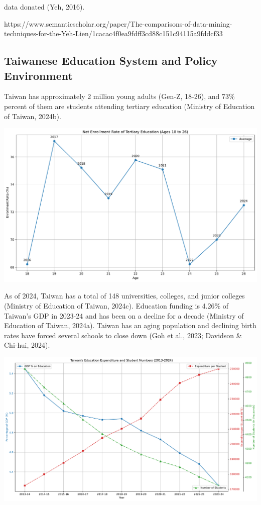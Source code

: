 \documentclass[
  letterpaper,
  DIV=11,
  numbers=noendperiod]{scrartcl}
\begin{document}
data donated (Yeh, 2016).

https://www.semanticscholar.org/paper/The-comparisons-of-data-mining-techniques-for-the-Yeh-Lien/1cacac4f0ea9fdff3cd88c151c94115a9fddcf33

\subsection{Taiwanese Education System and Policy
Environment}\label{taiwanese-education-system-and-policy-environment}

Taiwan has approximately 2 million young adults (Gen-Z, 18-26), and 73\%
percent of them are students attending tertiary education (Ministry of
Education of Taiwan, 2024b).

\includegraphics{_thesis_files/figure-pdf/cell-4-output-1.pdf}

As of 2024, Taiwan has a total of 148 universities, colleges, and junior
colleges (Ministry of Education of Taiwan, 2024c). Education funding is
4.26\% of Taiwan's GDP in 2023-24 and has been on a decline for a decade
(Ministry of Education of Taiwan, 2024a). Taiwan has an aging population
and declining birth rates have forced several schools to close down (Goh
et al., 2023; Davidson \& Chi-hui, 2024).

\includegraphics{_thesis_files/figure-pdf/cell-5-output-1.pdf}
\end{document}
